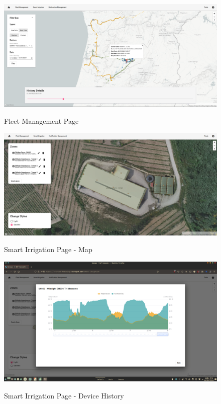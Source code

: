 \begin{figure}[H]
   \centering
   \resizebox{\columnwidth}{!}
   {
      \includegraphics{assets/figures/ui/fleet.png}
   }
   \caption[Fleet Management Page]{Fleet Management Page}
   \label{fig:AppendixD2:fleet}
\end{figure}

\begin{figure}[H]
   \centering
   \resizebox{\columnwidth}{!}
   {
      \includegraphics{assets/figures/ui/smart-irrigation-map.png}
   }
   \caption[Smart Irrigation Page - Map]{Smart Irrigation Page - Map}
   \label{fig:AppendixD2:irrigmap}
\end{figure}

\begin{figure}[H]
   \centering
   \resizebox{\columnwidth}{!}
   {
      \includegraphics{assets/figures/ui/smart-irrigation-history.png}
   }
   \caption[Smart Irrigation Page - Device History]{Smart Irrigation Page - Device History}
   \label{fig:AppendixD2:irrighistory}
\end{figure}
